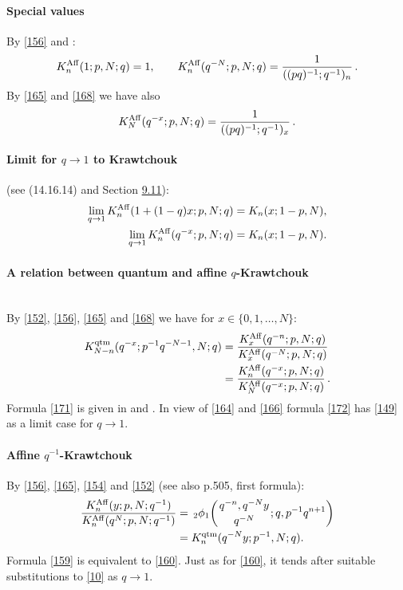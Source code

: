 \documentclass[twoside,11pt]{article}
\newcommand{\qhyp}[5]{\,\mbox{}_{#1}\phi_{#2}\!\left(
  \genfrac{}{}{0pt}{}{#3}{#4};#5\right)}
\begin{document}
\paragraph{Special values}
By \eqref{156} and :
\begin{equation}
K_n^{\rm Aff}(1;p,N;q)=1,\qquad
K_n^{\rm Aff}(q^{-N};p,N;q)=\frac1{((pq)^{-1};q^{-1})_n}\,.
\label{165}
\end{equation}
By \eqref{165} and \eqref{168} we have also
\begin{equation}
K_N^{\rm Aff}(q^{-x};p,N;q)=\frac1{((pq)^{-1};q^{-1})_x}\,.
\label{170}
\end{equation}
%
\paragraph{Limit for $q\to1$ to Krawtchouk} (see (14.16.14) and Section \hyperref[sec9.11]{9.11}):
\begin{align}
\lim_{q\to1} K_n^{\rm Aff}(1+(1-q)x;p,N;q)&=K_n(x;1-p,N),
\label{162}\\
\lim_{q\to1} K_n^{\rm Aff}(q^{-x};p,N;q)&=K_n(x;1-p,N).
\label{166}
\end{align}
%
\paragraph{A relation between quantum and affine $q$-Krawtchouk}\quad\\
By \eqref{152}, \eqref{156}, \eqref{165} and \eqref{168}
we have for $x\in\{0,1,\ldots,N\}$:
\begin{align}
K_{N-n}^{\rm qtm}(q^{-x};p^{-1}q^{-N-1},N;q)
&=\frac{K_x^{\rm Aff}(q^{-n};p,N;q)}{K_x^{\rm Aff}(q^{-N};p,N;q)}
\label{171}\\
&=\frac{K_n^{\rm Aff}(q^{-x};p,N;q)}{K_N^{\rm Aff}(q^{-x};p,N;q)}\,.
\label{172}
\end{align}
Formula \eqref{171} is given in \cite[formula after (12)]{K24}
and \cite[(59)]{K25}.
In view of \eqref{164} and \eqref{166}
formula \eqref{172} has \eqref{149} as a limit case for
$q\to 1$.
%
\paragraph{Affine $q^{-1}$-Krawtchouk}
By \eqref{156}, \eqref{165},
\eqref{154} and \eqref{152} (see also p.505, first formula):
\begin{align}
\frac{K_n^{\rm Aff}(y;p,N;q^{-1})}{K_n^{\rm Aff}(q^N;p,N;q^{-1})}
&=\qhyp21{q^{-n},q^{-N}y}{q^{-N}}{q,p^{-1}q^{n+1}}
\label{158}\\
&=K_n^{\rm qtm}(q^{-N}y;p^{-1},N;q).
\label{159}
\end{align}
Formula \eqref{159} is equivalent to \eqref{160}.
Just as for \eqref{160}, it tends after suitable substitutions to
\eqref{10} as $q\to1$.
\end{document}

